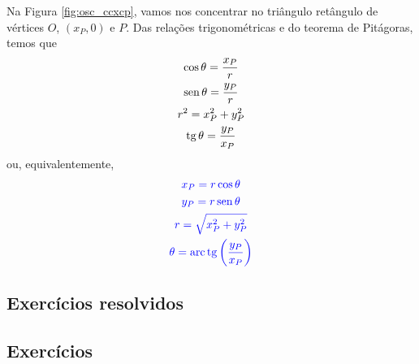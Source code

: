Na Figura \ref{fig:osc_ccxcp}, vamos nos concentrar no triângulo retângulo de vértices $O$, $(x_P, 0)$ e $P$. Das relações trigonométricas e do teorema de Pitágoras, temos que
\begin{gather}
  \cos\theta = \frac{x_P}{r} \\
  \operatorname{sen}\theta = \frac{y_P}{r} \\
  r^2 = x_P^2 + y_P^2 \\
  \operatorname{tg}\theta = \frac{y_P}{x_P}
\end{gather}
ou, equivalentemente,
\begin{gather}
  {\color{blue}x_P = r\cos\theta} \\
  {\color{blue}y_P = r\operatorname{sen}\theta} \\
  {\color{blue}r = \sqrt{x_P^2 + y_P^2 }} \\
  {\color{blue}\theta = \operatorname{arc}\operatorname{tg}\left(\frac{y_P}{x_P}\right)}
\end{gather}

\begin{ex}
  \emconstrucao
\end{ex}

\emconstrucao

\subsection{Exercícios resolvidos}

\emconstrucao

\subsection*{Exercícios}

\emconstrucao